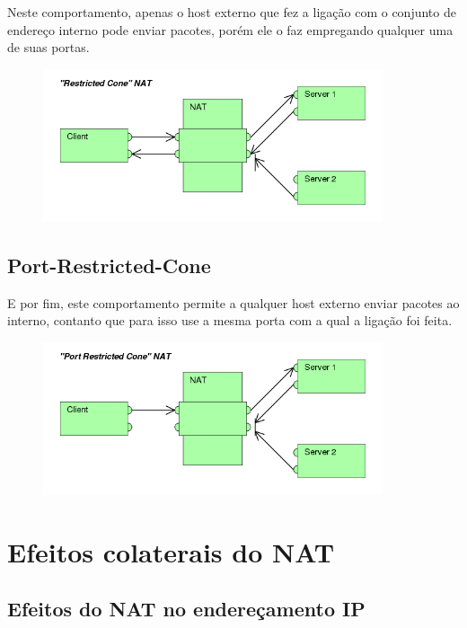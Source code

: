 \documentclass[
	12pt,				%
	oneside,			%
	a4paper,			%
	english,			%
	brazil,				%
	]{ime-abntex2}
\begin{document}
Neste comportamento, apenas o host externo que fez a ligação com o conjunto de endereço interno pode enviar
pacotes, porém ele o faz empregando qualquer  uma de suas portas.

\begin{figure}[ht]
\centering
\includegraphics[width=10cm]{imgs/600px-Restricted_Cone_NAT}
\end{figure}

\subsection{Port-Restricted-Cone}

E por fim, este comportamento permite a qualquer host externo enviar pacotes ao interno,
contanto que para isso use a mesma porta com a qual a ligação foi feita.

\begin{figure}[ht]
\centering
\includegraphics[width=10cm]{imgs/600px-Port_Restricted_Cone_NAT}
\end{figure}

\section{Efeitos colaterais do NAT}

\subsection{Efeitos do NAT no endereçamento IP}
\end{document}
